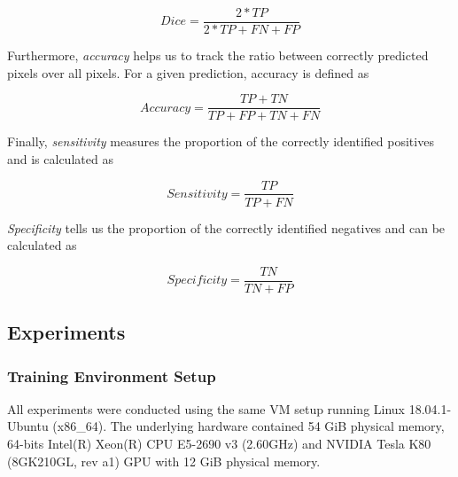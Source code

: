 \begin{equation}
  Dice = \frac{2 * TP}{2 * TP + FN + FP}
\end{equation}

Furthermore, \emph{accuracy} helps us to track the ratio between correctly predicted pixels over all pixels. For a given prediction, accuracy is defined as

\begin{equation}
  Accuracy = \frac{TP + TN}{TP + FP + TN + FN}
\end{equation}

Finally, \emph{sensitivity} measures the proportion of the correctly identified positives and is   calculated as

\begin{equation}
  Sensitivity = \frac{TP}{TP + FN}
\end{equation}

\emph{Specificity} tells us the proportion of the correctly identified negatives  and can be calculated as

\begin{equation}
  Specificity = \frac{TN}{TN + FP}
\end{equation}


\subsection{Experiments}

\subsubsection{Training Environment Setup}

All experiments were conducted using the same VM setup running Linux 18.04.1-Ubuntu (x86\_64). The underlying hardware contained 54 GiB physical memory, 64-bits Intel(R) Xeon(R) CPU E5-2690 v3 (2.60GHz) and NVIDIA Tesla K80 (8GK210GL, rev a1) GPU with 12 GiB physical memory.

